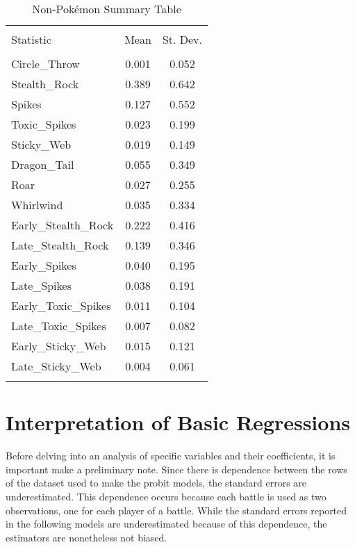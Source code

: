 \documentclass[12pt,twoside]{reedthesis}
\begin{document}
  \begin{table}[!htbp] \centering 
    \caption{Non-Pokémon Summary Table} 
    \label{} 
  \begin{tabular}{@{\extracolsep{5pt}}lcc} 
  \\[-1.8ex]\hline 
  \hline \\[-1.8ex] 
  Statistic & \multicolumn{1}{c}{Mean} & \multicolumn{1}{c}{St. Dev.} \\ 
  \hline \\[-1.8ex] 
  Circle\_Throw & 0.001 & 0.052 \\ 
  Stealth\_Rock & 0.389 & 0.642 \\ 
  Spikes & 0.127 & 0.552 \\ 
  Toxic\_Spikes & 0.023 & 0.199 \\ 
  Sticky\_Web & 0.019 & 0.149 \\ 
  Dragon\_Tail & 0.055 & 0.349 \\ 
  Roar & 0.027 & 0.255 \\ 
  Whirlwind & 0.035 & 0.334 \\ 
  Early\_Stealth\_Rock & 0.222 & 0.416 \\ 
  Late\_Stealth\_Rock & 0.139 & 0.346 \\ 
  Early\_Spikes & 0.040 & 0.195 \\ 
  Late\_Spikes & 0.038 & 0.191 \\ 
  Early\_Toxic\_Spikes & 0.011 & 0.104 \\ 
  Late\_Toxic\_Spikes & 0.007 & 0.082 \\ 
  Early\_Sticky\_Web & 0.015 & 0.121 \\ 
  Late\_Sticky\_Web & 0.004 & 0.061 \\ 
  \hline \\[-1.8ex] 
  \end{tabular} 
  \end{table}
  
  \section{Interpretation of Basic
  Regressions}\label{interpretation-of-basic-regressions}
  
  Before delving into an analysis of specific variables and their
  coefficients, it is important make a preliminary note. Since there is
  dependence between the rows of the dataset used to make the probit
  models, the standard errors are underestimated. This dependence occurs
  because each battle is used as two observations, one for each player of
  a battle. While the standard errors reported in the following models are
  underestimated because of this dependence, the estimators are
  nonetheless not biased.
  
\end{document}
